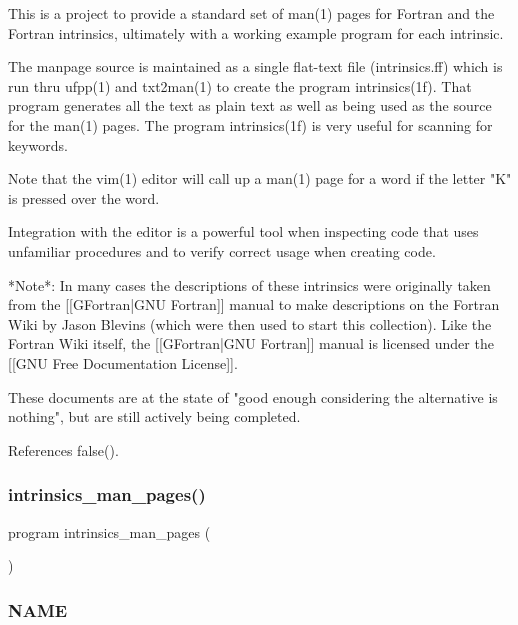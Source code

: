 \begin{DoxyVerb}This is a project to provide a standard set of man(1) pages for Fortran
and the Fortran intrinsics, ultimately with a working example program
for each intrinsic.

The manpage source is maintained as a single flat-text file (intrinsics.ff) which is
run thru ufpp(1) and txt2man(1) to create the program intrinsics(1f).
That program generates all the text as plain text as well as being used
as the source for the man(1) pages. The program intrinsics(1f) is
very useful for scanning for keywords.

Note that the vim(1) editor will call up a man(1) page for a word if
the letter "K" is pressed over the word.

Integration with the editor is a powerful tool when inspecting code
that uses unfamiliar procedures and to verify correct usage when
creating code.

*Note*: In many cases the descriptions of these intrinsics were
originally taken from the [[GFortran|GNU Fortran]] manual to make
descriptions on the Fortran Wiki by Jason Blevins (which were then
used to start this collection). Like the Fortran Wiki itself, the
[[GFortran|GNU Fortran]] manual is licensed under the [[GNU Free
Documentation License]].

These documents are at the state of "good enough considering the
alternative is nothing", but are still actively being completed. \end{DoxyVerb}
 

References false().

\mbox{\label{intrinsics_8f90_a47ddb3e494b21f6cf5e2853dc6d266b0}} 
\subsubsection{\texorpdfstring{intrinsics\+\_\+man\+\_\+pages()}{intrinsics\_man\_pages()}}
{\footnotesize\ttfamily program intrinsics\+\_\+man\+\_\+pages (\begin{DoxyParamCaption}{ }\end{DoxyParamCaption})}



\subsubsection*{N\+A\+ME}

